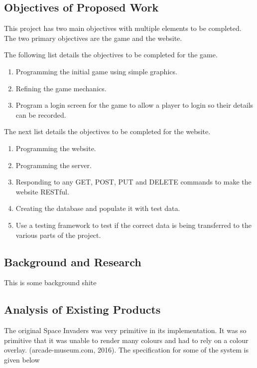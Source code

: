 \documentclass[12pt]{article}
\begin{document}
\begin{center}
\subsection{Objectives of Proposed Work}
\end{center}
This project has two main objectives with multiple elements to be completed. The two primary objectives are the game and the website. 

The following list details the objectives to be completed for the game.

\begin{enumerate}
\item Programming the initial game using simple graphics.
\item Refining the game mechanics.
\item Program a login screen for the game to allow a player to login so their details can
be recorded.
\end{enumerate}

The next list details the objectives to be completed for the website.

\begin{enumerate}
\item Programming the website.
\item Programming the server.
\item Responding to any GET, POST, PUT and DELETE commands to make the
website RESTful.
\item Creating the database and populate it with test data.
\item Use a testing framework to test if the correct data is being transferred to the
various parts of the project.
\end{enumerate}
\newpage

\begin{center}
\section{Background and Research}
This is some background shite
\end{center}

\begin{center}
\subsection{Analysis of Existing Products}
\end{center}
The original Space Invaders was very primitive in its implementation. It was so primitive that it was unable to render many colours and had to rely on a colour overlay. (arcade-museum.com, 2016). The specification for some of the system is given below
\end{document}
